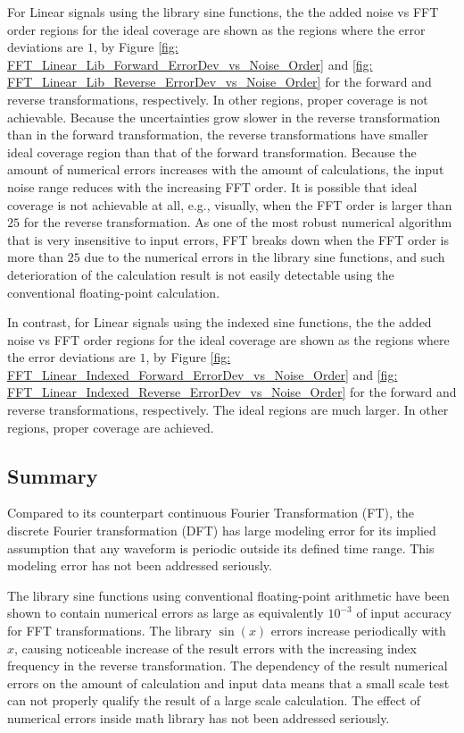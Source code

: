 \documentclass[twoside]{article}
\numberwithin{equation}{section}
\begin{document}
For Linear signals using the library sine functions, the the added noise vs FFT order regions for the ideal coverage are shown as the regions where the error deviations are $1$, by Figure \ref{fig: FFT_Linear_Lib_Forward_ErrorDev_vs_Noise_Order} and \ref{fig: FFT_Linear_Lib_Reverse_ErrorDev_vs_Noise_Order} for the forward and reverse transformations, respectively.
In other regions, proper coverage is not achievable.
Because the uncertainties grow slower in the reverse transformation than in the forward transformation, the reverse transformations have smaller ideal coverage region than that of the forward transformation.
Because the amount of numerical errors increases with the amount of calculations, the input noise range reduces with the increasing FFT order.
It is possible that ideal coverage is not achievable at all, e.g., visually, when the FFT order is larger than $25$ for the reverse transformation.
As one of the most robust numerical algorithm that is very insensitive to input errors, FFT breaks down when the FFT order is more than $25$ due to the numerical errors in the library sine functions, and such deterioration of the calculation result is not easily detectable using the conventional floating-point calculation.

In contrast, for Linear signals using the indexed sine functions, the the added noise vs FFT order regions for the ideal coverage are shown as the regions where the error deviations are $1$, by Figure \ref{fig: FFT_Linear_Indexed_Forward_ErrorDev_vs_Noise_Order} and \ref{fig: FFT_Linear_Indexed_Reverse_ErrorDev_vs_Noise_Order} for the forward and reverse transformations, respectively.
The ideal regions are much larger.
In other regions, proper coverage are achieved.


\subsection{Summary}

Compared to its counterpart continuous Fourier Transformation (FT), the discrete Fourier transformation (DFT) has large modeling error for its implied assumption that any waveform is periodic outside its defined time range.
This modeling error has not been addressed seriously.

The library sine functions using conventional floating-point arithmetic have been shown to contain numerical errors as large as equivalently  $10^{-3}$ of input accuracy for FFT transformations.
The library $\sin(x)$ errors increase periodically with $x$, causing noticeable increase of the result errors with the increasing index frequency in the reverse transformation.
The dependency of the result numerical errors on the amount of calculation and input data means that a small scale test can not properly qualify the result of a large scale calculation.
The effect of numerical errors inside math library has not been addressed seriously.
\end{document}
